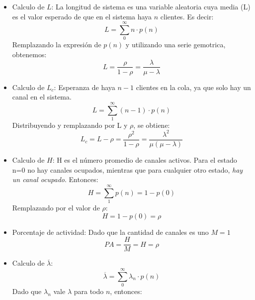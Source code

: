 \documentclass{article}
\begin{document}
\begin{itemize}
    \item Calculo de \(L\): La longitud de sistema es una variable aleatoria cuya media (L) es el valor esperado de que en el sistema haya \(n\) clientes. Es decir:
        \begin{equation} \label{eu_eqn}
            L = \sum_{0}^{\infty}n \cdot p(n) 
        \end{equation}
        Remplazando la expresión de \(p(n)\) y utilizando una serie gemotrica, obtenemos:
        \begin{equation} \label{eu_eqn}
            L = \frac{\rho}{1-\rho} = \frac{\lambda}{\mu-\lambda}
        \end{equation}
    \item Calculo de \(L_c\): Esperanza de haya \(n-1\) clientes en la cola, ya que solo hay un canal en el sistema.
        \begin{equation} \label{eu_eqn}
            L = \sum_{1}^{\infty}(n-1) \cdot p(n) 
        \end{equation}
        Distribuyendo y remplazando por L y \(\rho\), se obtiene:
        \begin{equation} \label{eu_eqn}
            L_c = L - \rho = \frac{\rho^2}{1-\rho} = \frac{\lambda^2}{\mu(\mu-\lambda)}
        \end{equation}
    \item Calculo de \(H\): H es el número promedio de canales activos. Para el estado n=0 no hay canales ocupados, mientras que para cualquier otro estado, \textit{hay un canal ocupado}. Entonces:
        \begin{equation} \label{eu_eqn}
            H = \sum_{1}^{\infty}p(n) = 1 -p(0) 
        \end{equation}
        Remplazando por el valor de \(\rho\):
        \begin{equation} \label{eu_eqn}
            H = 1 - p(0) = \rho
        \end{equation}
    \item Porcentaje de actividad: 
        Dado que la cantidad de canales es uno \(M=1\)
        \begin{equation} \label{eu_eqn}
            PA = \frac{H}{M} = H = \rho
        \end{equation}
    \item Calculo de \(\overline{\lambda}\): 
        \[
            \overline{\lambda} = \sum_{0}^{\infty}\lambda_n \cdot p(n) 
        \]
        Dado que \(\lambda_n\) vale \(\lambda\) para todo \(n\), entonces:
        \begin{align} 

\end{align}
\end{itemize}
\end{document}
